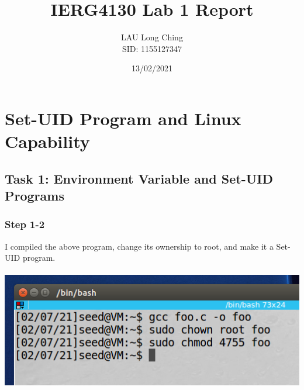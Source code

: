 \documentclass[a4paper]{article}
\title{\vspace{-1.5cm}IERG4130 Lab 1 Report}
\author{LAU Long Ching\\SID: 1155127347\\
        
}
\date{13/02/2021}
\begin{document}
\maketitle
\section{Set-UID Program and Linux Capability}
\subsection{Task 1: Environment Variable and Set-UID Programs}
\subsubsection{Step 1-2}
I compiled the above program, change its ownership to root, and make it a Set-UID program.\\\\
\includegraphics[scale=0.7]{1/1.png}
\end{document}

